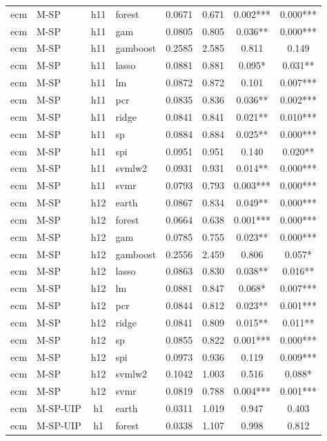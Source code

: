 \begin{ThreePartTable}
\begin{longtable}[t]{llclcccc}
ecm & M-SP & h11 & forest & 0.0671 & 0.671 & 0.002*** & 0.000***\\
ecm & M-SP & h11 & gam & 0.0805 & 0.805 & 0.036** & 0.000***\\
ecm & M-SP & h11 & gamboost & 0.2585 & 2.585 & 0.811 & 0.149\\
ecm & M-SP & h11 & lasso & 0.0881 & 0.881 & 0.095* & 0.031**\\
ecm & M-SP & h11 & lm & 0.0872 & 0.872 & 0.101 & 0.007***\\
ecm & M-SP & h11 & pcr & 0.0835 & 0.836 & 0.036** & 0.002***\\
ecm & M-SP & h11 & ridge & 0.0841 & 0.841 & 0.021** & 0.010***\\
ecm & M-SP & h11 & sp & 0.0884 & 0.884 & 0.025** & 0.000***\\
ecm & M-SP & h11 & spi & 0.0951 & 0.951 & 0.140 & 0.020**\\
ecm & M-SP & h11 & svmlw2 & 0.0931 & 0.931 & 0.014** & 0.000***\\
ecm & M-SP & h11 & svmr & 0.0793 & 0.793 & 0.003*** & 0.000***\\
\addlinespace
ecm & M-SP & h12 & earth & 0.0867 & 0.834 & 0.049** & 0.000***\\
ecm & M-SP & h12 & forest & 0.0664 & 0.638 & 0.001*** & 0.000***\\
ecm & M-SP & h12 & gam & 0.0785 & 0.755 & 0.023** & 0.000***\\
ecm & M-SP & h12 & gamboost & 0.2556 & 2.459 & 0.806 & 0.057*\\
ecm & M-SP & h12 & lasso & 0.0863 & 0.830 & 0.038** & 0.016**\\
ecm & M-SP & h12 & lm & 0.0881 & 0.847 & 0.068* & 0.007***\\
ecm & M-SP & h12 & pcr & 0.0844 & 0.812 & 0.023** & 0.001***\\
ecm & M-SP & h12 & ridge & 0.0841 & 0.809 & 0.015** & 0.011**\\
ecm & M-SP & h12 & sp & 0.0855 & 0.822 & 0.001*** & 0.000***\\
ecm & M-SP & h12 & spi & 0.0973 & 0.936 & 0.119 & 0.009***\\
ecm & M-SP & h12 & svmlw2 & 0.1042 & 1.003 & 0.516 & 0.088*\\
ecm & M-SP & h12 & svmr & 0.0819 & 0.788 & 0.004*** & 0.001***\\
\addlinespace
ecm & M-SP-UIP & h1 & earth & 0.0311 & 1.019 & 0.947 & 0.403\\
ecm & M-SP-UIP & h1 & forest & 0.0338 & 1.107 & 0.998 & 0.812\\

\end{longtable}
\end{ThreePartTable}
